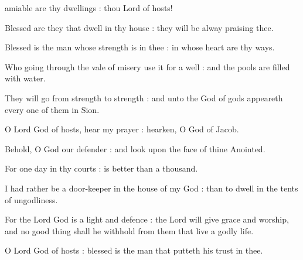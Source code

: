  amiable are thy dwellings : thou Lord of hosts!\par
{}
Blessed are they that dwell in thy house : they will be alway praising thee.\par
{}Blessed is the man whose strength is in thee : in whose heart are thy ways.\par
{}Who going through the vale of misery use it for a well : and the pools are filled with water.\par
{}They will go from strength to strength : and unto the God of gods appeareth every one of them in Sion.\par
{}O Lord God of hosts, hear my prayer : hearken, O God of Jacob.\par
{}Behold, O God our defender : and look upon the face of thine Anointed.\par
{}For one day in thy courts : is better than a thousand.\par
{}I had rather be a door-keeper in the house of my God : than to dwell in the tents of ungodliness.\par
{}For the Lord God is a light and defence : the Lord will give grace and worship, and no good thing shall he withhold from them that live a godly life.\par
{}O Lord God of hosts : blessed is the man that putteth his trust in thee.\par



